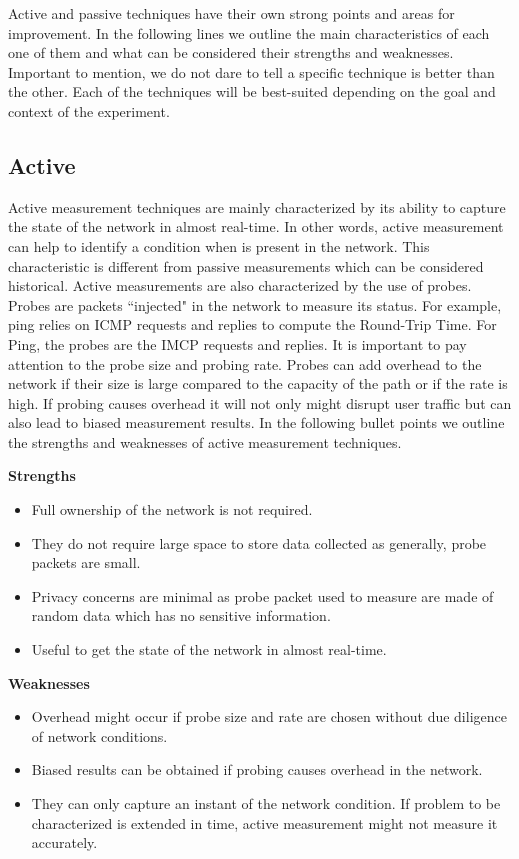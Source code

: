  Active and passive techniques have their own strong points and areas for improvement. In the following lines we outline the main characteristics of each one of them and what can be considered their strengths and weaknesses. Important to mention, we do not dare to tell a specific technique is better than the other. Each of the techniques will be best-suited depending on the  goal and context of the experiment.

\subsection*{Active}

Active measurement techniques are mainly characterized by its ability to capture the state of the network in almost real-time. In other words, active measurement can help to identify a condition when is present in the network. This characteristic is different from passive measurements which can be considered historical. Active measurements are also characterized by the use of probes. Probes are packets ``injected" in the network to measure its status. For example, ping relies on ICMP requests and replies to compute the Round-Trip Time. For Ping, the probes are the IMCP requests and replies. It is important to pay attention to the probe size and probing rate. Probes can add overhead to the network if their size is large compared to the capacity of the path or if the rate is high. If probing causes overhead it will not only might disrupt user traffic but can also lead to biased measurement results. In the following bullet points we outline the strengths and weaknesses of active measurement techniques.

\textbf{Strengths}
\begin{itemize}
	\item Full ownership of the network is not required.
	\item They do not require large space to store data collected as generally, probe packets are small.
	\item Privacy concerns are minimal as probe packet used to measure are made of random data which has no sensitive information.
	\item Useful to get the state of the network in almost real-time.
\end{itemize}
	

\textbf{Weaknesses}
\begin{itemize}
	\item Overhead might occur if probe size and rate are chosen without due diligence of network conditions.
	\item Biased results can be obtained if probing causes overhead in the network.
	\item They can only capture an instant of the network condition. If problem to be characterized is extended in time, active measurement might not measure it accurately.
\end{itemize}



